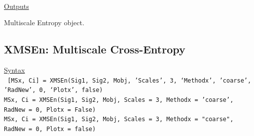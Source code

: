 \documentclass[12pt, a4paper, titlepage, openany]{book}
\begin{document}
\ \\ \noindent \ul{Outputs}
\begin{description}[labelsep=1cm, labelwidth=2cm, nosep, style=multiline,leftmargin=4cm]\footnotesize
\item[\texttt{Mobj}]		Multiscale Entropy object.
\end{description}



\newpage
\subsection{\normalsize XMSEn: \hspace{15mm} Multiscale Cross-Entropy} \label{XMSEn}
\noindent\ul{Syntax} \vspace{6mm} \\ \noindent \texttt{\footnotesize
[MSx, Ci] = XMSEn(Sig1, Sig2, Mobj, 'Scales', 3, ‘Methodx’, 'coarse', 'RadNew', 0, ‘Plotx’, false)\\
MSx, Ci = XMSEn(Sig1, Sig2, Mobj, Scales = 3, Methodx = 'coarse', RadNew = 0, Plotx = False)\\ 
MSx, Ci = XMSEn(Sig1, Sig2, Mobj, Scales = 3, Methodx = "coarse", RadNew = 0, Plotx = false)}
\end{document}
